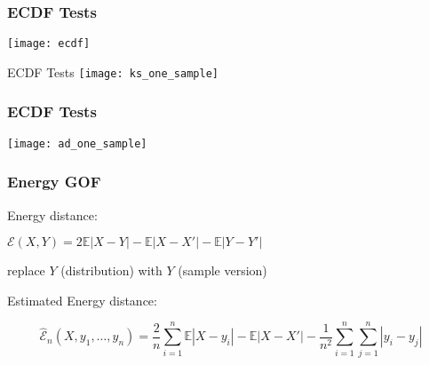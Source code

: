 \documentclass[presentation]{beamer}
\begin{document}
\begin{frame}
  \frametitle{ECDF Tests}
  \texttt{[image: ecdf]}
\end{frame}

\begin{frame}{ECDF Tests}
  \texttt{[image: ks\_one\_sample]}
\end{frame}

\begin{frame}
  \frametitle{ECDF Tests}
  \texttt{[image: ad\_one\_sample]}  
\end{frame}


\begin{frame}
  \frametitle{Energy GOF}
  \begin{block}{Energy distance:}
    \begin{center}
      $\mathcal{E}(X,Y) = 2\mathbb{E}|X - Y| - \mathbb{E}|X - X'| -
      \mathbb{E}|Y - Y'|$
    \end{center}
  \end{block}
  replace $Y$ (distribution) with $Y$ (sample version)
  \begin{block}{Estimated Energy distance:}
    \begin{center}
      $$\hat{\mathcal{E}}_n(X, y_1, \ldots, y_n) = \frac{2}{n} \sum_{i=1}^n \mathbb{E}|X - y_i|  - \mathbb{E}|X - X'|  - \frac{1}{n^2} \sum_{i=1}^n \sum_{j=1}^n |y_i - y_j|$$
    \end{center}
  \end{block}  
\end{frame}
\end{document}

